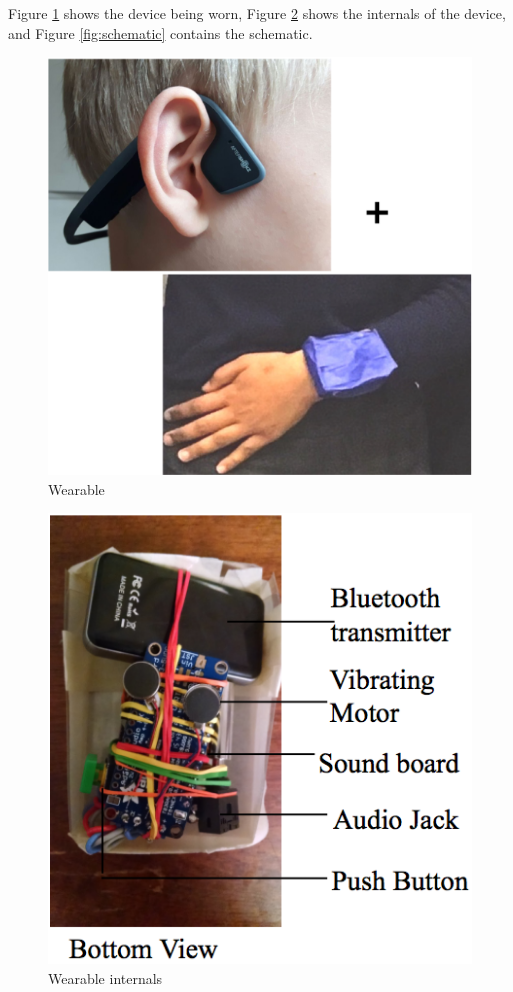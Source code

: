 Figure \ref{fig:wearable} shows the device being worn, Figure \ref{fig:insides} shows the internals of the device, and Figure \ref{fig:schematic} contains the schematic.

\begin{figure}[htbp]
\centering
\begin{center}
\includegraphics[width=.75\columnwidth]{figures/W.png}
\end{center}
\caption{Wearable}
\label{fig:wearable}
\end{figure}

\begin{figure}[htbp]
\centering
\begin{center}
\includegraphics[width=.6\columnwidth]{figures/labeled.png}
\end{center}
\caption{Wearable internals}
\label{fig:insides}
\end{figure}

